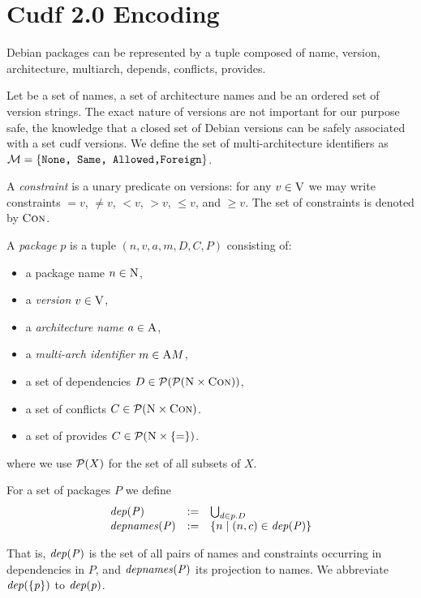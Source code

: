 \section{Cudf 2.0 Encoding}

Debian packages can be represented by a tuple composed of name,
version, architecture, multiarch, depends, conflicts, provides.

Let \names{} be a set of names, \architectures{} a set of architecture
names and \versions{} be an ordered set of version strings. The exact
nature of versions are not important for our purpose safe, the knowledge
that a closed set of Debian versions can be safely associated with a
set cudf versions. We define the set of multi-architecture identifiers
as $\cal{M} = \{ \texttt{None, Same, Allowed,Foreign} \}$.

A \emph{constraint} is a unary predicate on versions: for any $v \in
\versions$ we may write constraints $=v$, $\neq v$, $<v$, $>v$, $\leq
v$, and $\geq v$.  The set of constraints is denoted by $\con$.

\begin{definition} 
  A \emph{package} $p$ is a tuple $(n,v,a,m,D,C,P)$ consisting of:
  \begin{itemize}
    \item a {\rm package name} $n \in \names$,
    \item a {\em version} $v \in \versions$,
    \item a {\em architecture name} $a \in \architectures{}$,
    \item a {\em multi-arch identifier} $m \in \multiarchs{M}$,
    \item a set of dependencies $D \in\power{\power{\names\times\con}}$,
    \item a set of conflicts $C \in\power{\names\times\con}$.
    \item a set of provides $C \in\power{\names\times \{ = \} }$.
  \end{itemize}
\end{definition}
where we use $\power{X}$ for the set of all subsets of $X$.

\begin{definition}
  For a set of packages $P$ we define
  \[
    \begin{array}{lcl}
      \dep{P} & := & \bigcup_{d \in \dependency{p}} \\
      \depnames{P} & := & \{ n \mid (n,c) \in \dep{P}\}
    \end{array}
  \]
\end{definition}
That is, $\dep{P}$ is the set of all pairs of names and
constraints occurring in dependencies in $P$, and $\depnames{P}$ its
projection to names. We abbreviate $\dep{\{p\}}$ to $\dep{p}$.

